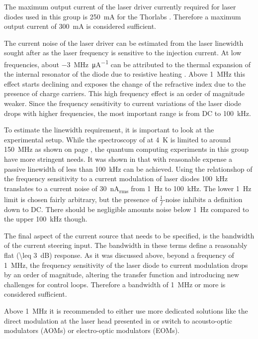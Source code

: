 The maximum output current of the laser driver currently required for laser diodes used in this group is \qty{250}{\mA} for the Thorlabs  \cite{datasheet_thorlabs_780nm}. Therefore a maximum output current of \qty{300}{\mA} is considered sufficient.

The current noise of the laser driver can be estimated from the laser linewidth sought after as the laser frequency is sensitive to the injection current. At low frequencies, about \qty[per-mode=symbol]{-3}{\MHz \per \micro \A} can be attributed to the thermal expansion of the internal resonator of the diode due to resistive heating \cite{diodelaser_modulation}. Above \qty{1}{\MHz} this effect starts declining and exposes the change of the refractive index due to the presence of charge carriers. This high frequency effect is an order of magnitude weaker. Since the frequency sensitivity to current variations of the laser diode drops with higher frequencies, the most important range is from DC to \qty{100}{\kHz}.

To estimate the linewidth requirement, it is important to look at the experimental setup. While the spectroscopy of  at \qty{4}{\K} is limited to around \qty{150}{\MHz}  as shown on page \pageref{eqn:doppler_broadening}, the quantum computing experiments in this group have more stringent needs. It was shown in \cite{ecdl_stability, ecdl_silicone_housing,ecdl_linewidth_scholten} that with reasonable expense a passive linewidth of less than \qty{100}{\kHz} can be achieved. Using the relationshop of the frequency sensitivity to a current modulation of laser diodes \qty{100}{\kHz} translates to a current noise of \qty{30}{\nA_{rms}} from \qty{1}{\Hz} to \qty{100}{\kHz}. The lower \qty{1}{\Hz} limit is chosen fairly arbitrary, but the presence of $\frac 1 f$-noise inhibits a definition down to DC. There should be negligible amounts noise below \qty{1}{\Hz} compared to the upper \qty{100}{\kHz} though.

The final aspect of the current source that needs to be specified, is the bandwidth of the current steering input. The bandwidth in these terms define a reasonably flat (\qty{\leq 3}{\dB}) response. As it was discussed above, beyond a frequency of \qty{1}{\MHz}, the frequency sensitivity of the laser diode to current modulation drops by an order of magnitude, altering the transfer function and introducing new challenges for control loops. Therefore a bandwidth of \qty{1}{\MHz} or more is considered sufficient.

Above \qty{1}{\MHz} it is recommended to either use more dedicated solutions like the direct modulation at the laser head presented in \cite{current_mod_paper} or switch to acousto-optic modulators (AOMs) or electro-optic modulators (EOMs).

